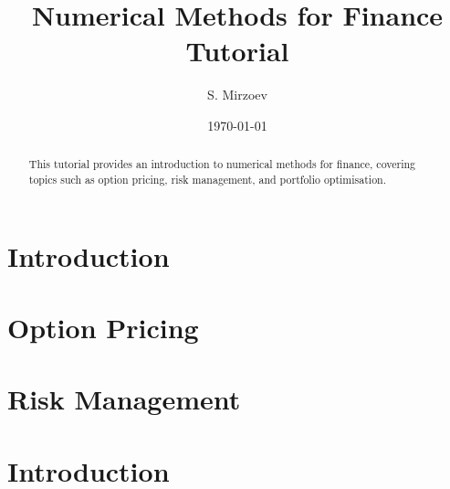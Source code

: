 \documentclass{article}
\title{Numerical Methods for Finance Tutorial}
\author{S. Mirzoev}
\date{\today}
\begin{document}
\maketitle

\begin{abstract}
This tutorial provides an introduction to numerical methods for finance, covering topics such as option pricing, risk management, and portfolio optimisation.
\end{abstract}

\section{Introduction}


\section{Option Pricing}
% 

\section{Risk Management}
% 


\section{Introduction}
\end{document}
